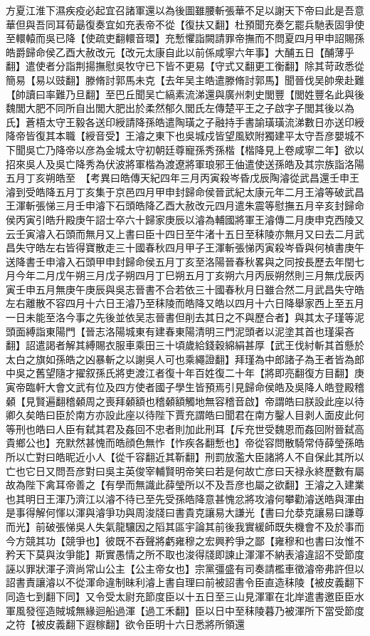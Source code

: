 方夏江淮下濕疾疫必起宜召諸軍還以為後圖雖腰斬張華不足以謝天下帝曰此是吾意華但與吾同耳荀朂復奏宜如充表帝不從【復扶又翻】杜預聞充奏乞罷兵馳表固爭使至轘轅而吳已降【使疏吏翻轘音環】充慙懼詣闕請罪帝撫而不問夏四月甲申詔賜孫皓爵歸命侯乙酉大赦改元【改元太康自此以前係咸寧六年事】大酺五日【酺薄乎翻】遣使者分詣荆揚撫慰吳牧守已下皆不更易【守式又翻更工衡翻】除其苛政悉從簡易【易以豉翻】滕脩討郭馬未克【去年吴主皓遣滕脩討郭馬】聞晉伐吴帥衆赴難【帥讀曰率難乃旦翻】至巴丘聞吴亡縞素流涕還與廣州刺史閭豐【閭姓豐名此與後魏閭大肥不同所自出閭大肥出於柔然郁久閭氏左傳楚平王之子啟字子閭其後以為氏】蒼梧太守王毅各送印綬請降孫皓遣陶璜之子融持手書諭璜璜流涕數日亦送印綬降帝皆復其本職【綬音受】王濬之東下也吳城戍皆望風欵附獨建平太守吾彦嬰城不下聞吳亡乃降帝以彦為金城太守初朝廷尊寵孫秀孫楷【楷降見上卷咸寧二年】欲以招來吳人及吳亡降秀為伏波將軍楷為渡遼將軍琅邪王伷遣使送孫皓及其宗族詣洛陽五月丁亥朔皓至　【考異曰皓傳天紀四年三月丙寅殺岑昏戊辰陶濬從武昌還壬申王濬到受皓降五月丁亥集于京邑四月甲申封歸命侯晉武紀太康元年二月王濬等破武昌王渾斬張悌三月壬申濬下石頭皓降乙酉大赦改元四月遣朱震等慰撫五月辛亥封歸命侯丙寅引皓升殿庚午詔士卒六十歸家庚辰以濬為輔國將軍王濬傳二月庚申克西陵又云壬寅濬入石頭而無月又上書曰臣十四日至牛渚十五日至秣陵亦無月又曰去二月武昌失守皓左右皆得寶散走三十國春秋四月甲子王渾斬張悌丙寅殺岑昏與何楨書庚午送降書壬申濬入石頭甲申封歸命侯五月丁亥至洛陽晉春秋畧與之同按長歷去年閏七月今年二月戊午朔三月戊子朔四月丁巳朔五月丁亥朔六月丙辰朔然則三月無戊辰丙寅壬申五月無庚午庚辰與吳志晉書不合若依三十國春秋月日雖合然二月武昌失守皓左右離散不容四月十六日王濬乃至秣陵而皓降又皓以四月十六日降舉家西上至五月一日未能至洛今事之先後並依吴志晉書但削去其日之不與歷合者】與其太子瑾等泥頭面縛詣東陽門【晉志洛陽城東有建春東陽清明三門泥頭者以泥塗其首也瑾渠吝翻】詔遣謁者解其縛賜衣服車乘田三十頃歲給錢穀綿絹甚厚【武王伐紂斬其首懸於太白之旗如孫皓之凶暴斬之以謝吳人可也乘繩證翻】拜瑾為中郎諸子為王者皆為郎中吳之舊望隨才擢叙孫氏將吏渡江者復十年百姓復二十年【將即亮翻復方目翻】庚寅帝臨軒大會文武有位及四方使者國子學生皆預焉引見歸命侯皓及吳降人皓登殿稽顙【見賢遍翻稽顙周之喪拜顙額也稽顙額觸地無容稽音啟】帝謂皓曰朕設此座以待卿久矣皓曰臣於南方亦設此座以待陛下賈充謂皓曰聞君在南方鑿人目剥人面皮此何等刑也皓曰人臣有弑其君及姦回不忠者則加此刑耳【斥充世受魏恩而姦回附晉弑高貴鄉公也】充默然甚愧而皓顔色無怍【怍疾各翻慙也】帝從容問散騎常侍薛瑩孫皓所以亡對曰皓昵近小人【從千容翻近其靳翻】刑罰放濫大臣諸將人不自保此其所以亡也它日又問吾彦對曰吳主英俊宰輔賢明帝笑曰若是何故亡彦曰天禄永終歷數有屬故為陛下禽耳帝善之【有學而無識此薛瑩所以不及吾彦也屬之欲翻】王濬之入建業也其明日王渾乃濟江以濬不待已至先受孫皓降意甚愧忿將攻濬何攀勸濬送皓與渾由是事得解何惲以渾與濬爭功與周浚牋曰書貴克讓易大謙光【書曰允㳟克讓易曰謙尊而光】前破張悌吳人失氣龍驤因之䧟其區宇論其前後我實緩師既失機會不及於事而今方競其功【競爭也】彼既不吞聲將虧雍穆之宏興矜爭之鄙【雍穆和也書曰汝惟不矜天下莫與汝爭能】斯實愚情之所不取也浚得牋即諫止渾渾不納表濬違詔不受節度誣以罪狀渾子濟尚常山公主【公主帝女也】宗黨彊盛有司奏請檻車徵濬帝弗許但以詔書責讓濬以不從渾命違制昧利濬上書自理曰前被詔書令臣直造秣陵【被皮義翻下同造七到翻下同】又令受太尉充節度臣以十五日至三山見渾軍在北岸遣書邀臣臣水軍風發徑造賊城無緣迴船過渾【過工禾翻】臣以日中至秣陵暮乃被渾所下當受節度之符【被皮義翻下遐稼翻】欲令臣明十六日悉將所領還